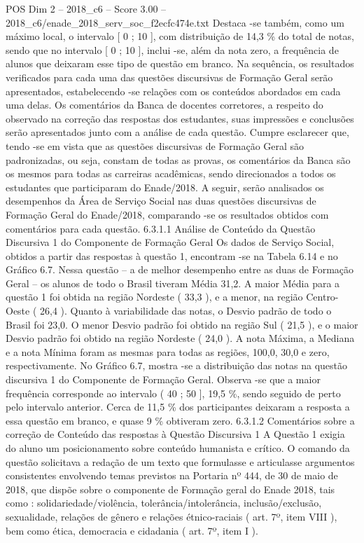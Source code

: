 \begin{textsample}{POS Dim 2 – 2018\_c6 – Score 3.00 – 2018\_c6/enade\_2018\_serv\_soc\_f2ecfc474e.txt}
Destaca -se também, como um máximo local, o intervalo [ 0 ; 10 ], com distribuição de 14,3 \% do total de notas, sendo que no intervalo [ 0 ; 10 ], inclui -se, além da nota zero, a frequência de alunos que deixaram esse tipo de questão em branco.
Na sequência, os resultados verificados para cada uma das questões discursivas de Formação Geral serão apresentados, estabelecendo -se relações com os conteúdos abordados em cada uma delas.
Os comentários da Banca de docentes corretores, a respeito do observado na correção das respostas dos estudantes, suas impressões e conclusões serão apresentados junto com a análise de cada questão.
Cumpre esclarecer que, tendo -se em vista que as questões discursivas de Formação Geral são padronizadas, ou seja, constam de todas as provas, os comentários da Banca são os mesmos para todas as carreiras acadêmicas, sendo direcionados a todos os estudantes que participaram do Enade/2018.
A seguir, serão analisados os desempenhos da Área de Serviço Social nas duas questões discursivas de Formação Geral do Enade/2018, comparando -se os resultados obtidos com comentários para cada questão. 6.3.1.1 Análise de Conteúdo da Questão Discursiva 1 do Componente de Formação Geral Os dados de Serviço Social, obtidos a partir das respostas à questão 1, encontram -se na Tabela 6.14 e no Gráfico 6.7.
Nessa questão – a de melhor desempenho entre as duas de Formação Geral – os alunos de todo o Brasil tiveram Média 31,2.
A maior Média para a questão 1 foi obtida na região Nordeste ( 33,3 ), e a menor, na região Centro-Oeste ( 26,4 ).
Quanto à variabilidade das notas, o Desvio padrão de todo o Brasil foi 23,0.
O menor Desvio padrão foi obtido na região Sul ( 21,5 ), e o maior Desvio padrão foi obtido na região Nordeste ( 24,0 ).
A nota Máxima, a Mediana e a nota Mínima foram as mesmas para todas as regiões, 100,0, 30,0 e zero, respectivamente.
No Gráfico 6.7, mostra -se a distribuição das notas na questão discursiva 1 do Componente de Formação Geral.
Observa -se que a maior frequência corresponde ao intervalo ( 40 ; 50 ], 19,5 \%, sendo seguido de perto pelo intervalo anterior.
Cerca de 11,5 \% dos participantes deixaram a resposta a essa questão em branco, e quase 9 \% obtiveram zero. 6.3.1.2 Comentários sobre a correção de Conteúdo das respostas à Questão Discursiva 1 A Questão 1 exigia do aluno um posicionamento sobre conteúdo humanista e crítico.
O comando da questão solicitava a redação de um texto que formulasse e articulasse argumentos consistentes envolvendo temas previstos na Portaria nº 444, de 30 de maio de 2018, que dispõe sobre o componente de Formação geral do Enade 2018, tais como : solidariedade/violência, tolerância/intolerância, inclusão/exclusão, sexualidade, relações de gênero e relações étnico-raciais ( art. 7º, item VIII ), bem como ética, democracia e cidadania ( art. 7º, item I ).

\end{textsample}
